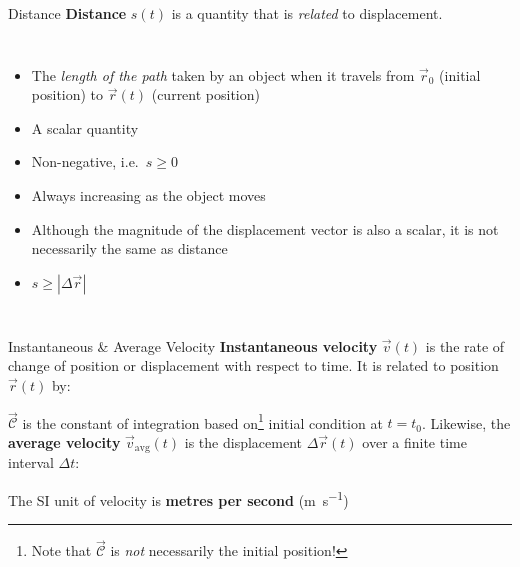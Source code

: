 \documentclass[12pt,compress,aspectratio=169,dvipsnames]{beamer}
\begin{document}
\begin{frame}{Distance}
  \textbf{Distance} $s(t)$ is a quantity that is \emph{related} to displacement.
  \begin{columns}
    \begin{itemize}
    \item The \emph{length of the path} taken by an object when it travels from
      $\vec r_0$ (initial position) to $\vec r(t)$ (current position)
    \item A scalar quantity
    \item Non-negative, i.e.\ $s\geq 0$
    \item Always increasing as the object moves
    \item Although the magnitude of the displacement vector is also a scalar,
      it is not necessarily the same as distance
    \item $s\geq |\Delta\vec r|$
    \end{itemize}
    
  \end{columns}
\end{frame}



\begin{frame}{Instantaneous \& Average Velocity}
  \textbf{Instantaneous velocity} $\vec v(t)$ is the rate of change of
  position or displacement
  with respect to time. It is related to position $\vec r(t)$ by:


  $\vec{\mathcal C}$ is the constant of integration based on\footnote{Note that
  $\vec{\mathcal C}$ is \emph{not} necessarily the initial position!} initial
  condition at $t=t_0$. Likewise, the \textbf{average velocity}
  $\vec v_\text{avg}(t)$ is the displacement $\Delta\vec r(t)$ over a finite
  time interval $\Delta t$:


  The SI unit of velocity is \textbf{metres per second} (\si{\metre\per\second})
  \vspace{.2in}
\end{frame}
\end{document}
